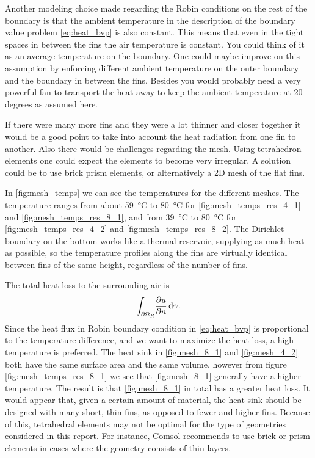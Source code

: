 Another modeling choice made regarding the Robin conditions on the rest of the boundary is that the ambient temperature in the description of the boundary value problem \cref{eq:heat_bvp} is also constant. This means that even in the tight spaces in between the fins the air temperature is constant. You could think of it as an average temperature on the boundary. One could maybe improve on this assumption by enforcing different ambient temperature on the outer boundary and the boundary in between the fins. Besides you would probably need a very powerful fan to transport the heat away to keep the ambient temperature at 20 degrees as assumed here.

If there were many more fins and they were a lot thinner and closer together it would be a good point to take into account the heat radiation from one fin to another. Also there would be challenges regarding the mesh. Using tetrahedron elements one could expect the elements to become very irregular. A solution could be to use brick prism elements, or alternatively a 2D mesh of the flat fins.

In \cref{fig:mesh_temps} we can see the temperatures for the different meshes. The temperature ranges from about \SI{59}{\celsius} to \SI{80}{\celsius} for \cref{fig:mesh_temps_res_4_1} and \cref{fig:mesh_temps_res_8_1}, and from \SI{39}{\celsius} to \SI{80}{\celsius} for \cref{fig:mesh_temps_res_4_2} and \cref{fig:mesh_temps_res_8_2}. The Dirichlet boundary on the bottom works like a thermal reservoir, supplying as much heat as possible, so the temperature profiles along the fins are virtually identical between fins of the same height, regardless of the number of fins.

The total heat loss to the surrounding air is
\begin{equation}
\int_{\partial\Omega_R}\! \pdv{u}{n}\, \mathrm{d}{\gamma}.
\end{equation}
Since the heat flux in Robin boundary condition in \cref{eq:heat_bvp} is proportional to the temperature difference, and we want to maximize the heat loss, a high temperature is preferred. The heat sink in \cref{fig:mesh_8_1} and \cref{fig:mesh_4_2} both have the same surface area and the same volume, however from figure \ref{fig:mesh_temps_res_8_1} we see that \cref{fig:mesh_8_1} generally have a higher temperature. The result is that \cref{fig:mesh_8_1} in total has a greater heat loss. It would appear that, given a certain amount of material, the heat sink should be designed with many short, thin fins, as opposed to fewer and higher fins. Because of this, tetrahedral elements may not be optimal for the type of geometries considered in this report. For instance, Comsol \cite{comsol_mesh_types} recommends to use brick or prism elements in cases where the geometry consists of thin layers.